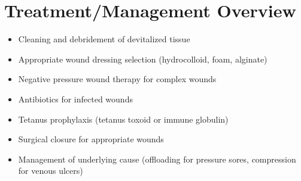 \section{Treatment/Management Overview}
\begin{itemize}
\item Cleaning and debridement of devitalized tissue
\item Appropriate wound dressing selection (hydrocolloid, foam, alginate)
\item Negative pressure wound therapy for complex wounds
\item Antibiotics for infected wounds
\item Tetanus prophylaxis (tetanus toxoid or immune globulin)
\item Surgical closure for appropriate wounds
\item Management of underlying cause (offloading for pressure sores, compression for venous ulcers)
\end{itemize}
